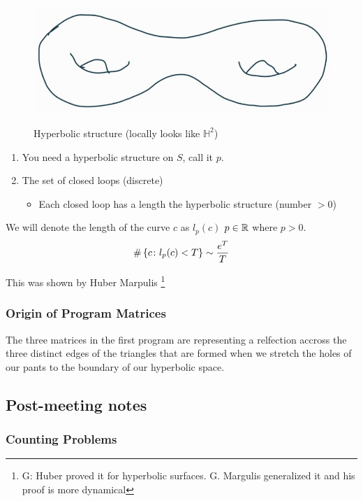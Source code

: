 \documentclass{amsart}
\def\GM #1{\footnote{\color{magenta} G: #1}}
\begin{document}
	\begin{figure}[h]
		\includegraphics[width=0.5\linewidth]{g2_torus}
		\label{fig:g2_torus}
		\caption{Hyperbolic structure (locally looks like $\mathbb{H}^2$)}
	\end{figure}
	
	\begin{enumerate}
		\item You need a hyperbolic structure on $S$, call it  $p$.
		\item The set of closed loops (discrete)
		\begin{itemize}
			\item Each closed loop has a length \wrt the hyperbolic structure (number $> 0$)
		\end{itemize}
	\end{enumerate}
	
	We will denote the length of the curve $c$ as $l_p(c)$ \wrt $p \in \mathbb{R}$ where $p > 0$.
	\begin{equation*}
		\# \left\{c \colon l_p(c) < T\right\} \sim \frac{e^T}{T}
	\end{equation*}
	\begin{remark}
		This was shown by Huber Marpulis \GM{Huber proved it for hyperbolic surfaces. G. Margulis generalized it and his proof is more dynamical}
	\end{remark}
	
	\subsubsection*{Origin of Program Matrices}
	
	The three matrices in the first program are representing a relfection accross the three distinct edges of the triangles that are formed when we stretch the holes of our pants to the boundary of our hyperbolic space. 
	
	
\subsection{Post-meeting notes}

\subsubsection{Counting Problems}
\end{document}
